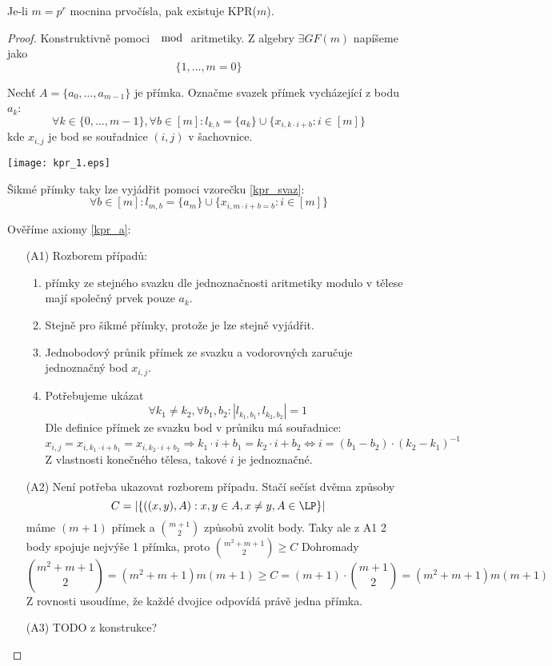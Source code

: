 \begin{theorem}
    Je-li $m=p^r$ mocnina prvočísla, pak existuje KPR($m$).
\end{theorem}
\begin{proof}
	Konstruktivně pomoci $\mod$ aritmetiky.
	Z algebry $\exists GF(m)$ napíšeme jako
	\[ \{ 1, \ldots, m = 0 \} \]

	Nechť $A = \{ a_0, \ldots, a_{m - 1} \}$ je přímka.
	Označme svazek přímek vycházející z bodu $a_k$:
	\begin{equation}\label{kpr_svaz}
		\forall k \in \{ 0, \ldots, m - 1 \}, \forall b \in [m]: l_{k, b} = \{ a_k \} \cup \{ x_{i, k\cdot i + b}: i \in [m] \}
	\end{equation}
	kde $x_{i, j}$ je bod se souřadnice $(i, j)$ v šachovnice.

	\texttt{[image: kpr\_1.eps]}

	Šikmé přímky taky lze vyjádřit pomoci vzorečku \eqref{kpr_svaz}:
	\[ \forall b \in [m]: l_{m, b} = \{ a_m \} \cup \{ x_{i, m\cdot i + b = b}: i \in [m] \} \]

	Ověříme axiomy \cref{kpr_a}:
    	\begin{itemize}
    	    \item[(A1)] Rozborem případů:
		    \begin{enumerate}
			    \item přímky ze stejného svazku dle jednoznačnosti aritmetiky modulo v tělese mají společný prvek pouze $a_k$.
			    \item Stejně pro šikmé přímky, protože je lze stejně vyjádřit.
			    \item Jednobodový průnik přímek ze svazku a vodorovných zaručuje jednoznačný bod $x_{i, j}$.
			    \item Potřebujeme ukázat
				    \[ \forall k_1 \ne k_2, \forall b_1, b_2: |l_{k_1, b_1}, l_{k_2, b_2}| = 1 \]
				    Dle definice přímek ze svazku bod v průniku má souřadnice:
				    \[ x_{i, j} = x_{i, k_1 \cdot i + b_1} = x_{i, k_2 \cdot i + b_2} \Rightarrow k_1 \cdot i + b_1 = k_2 \cdot i + b_2 \iff i = (b_1 - b_2) \cdot (k_2 - k_1)^{-1} \]
				    Z vlastnosti konečného tělesa, takové $i$ je jednoznačné.
		    \end{enumerate}
    	    \item[(A2)] Není potřeba ukazovat rozborem případu. Stačí sečíst dvěma způsoby
		    \[ C = |\{ ((x, y), A) : x, y \in A, x \ne y, A \in \LP \}| \]
		    máme $(m + 1)$ přímek a $\binom{m + 1}{2}$ způsobů zvolit body.
		    Taky ale z A1 2 body spojuje nejvýše 1 přímka, proto $\binom{m^2 + m + 1}{2} \geq C$
		    Dohromady
		    \[ \binom{m^2 + m + 1}{2} = (m^2 + m + 1) m (m + 1) \geq C = (m + 1) \cdot \binom{m + 1}{2} = (m^2 + m + 1) m (m + 1) \]
		    Z rovnosti usoudíme, že každé dvojice odpovídá právě jedna přímka.
    	    \item[(A3)] TODO z konstrukce?
    	\end{itemize}
\end{proof}

